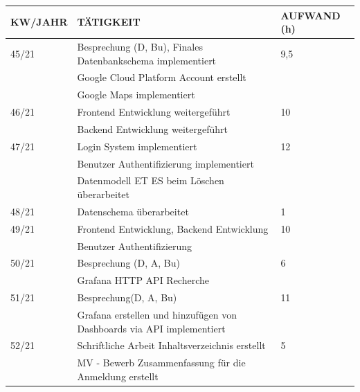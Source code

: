 \newpage
\begin{table}[h]
	\begin{tabular}{|l|l|l|}
		\hline
		\textbf{KW/JAHR} &     \textbf{TÄTIGKEIT}  & 	\textbf{AUFWAND (h)}    \\ \hline
		
		45/21   & Besprechung (D, Bu), Finales Datenbankschema implementiert & 9,5	\\ 
		
		& Google Cloud Platform Account erstellt & \\
		& Google Maps implementiert & \\ \hline
		
		
		
		
		46/21   & Frontend Entwicklung weitergeführt  & 10 	\\
		& Backend Entwicklung weitergeführt& \\ \hline
		
		
		
		
		47/21   & Login System implementiert  & 12 	\\
			& Benutzer Authentifizierung implementiert & \\ 
			& Datenmodell ET ES beim Löschen überarbeitet & \\ \hline
		
		
		
		
		
		48/21   & Datenschema überarbeitet& 1	\\ \hline
		
		
		49/21   & Frontend Entwicklung, Backend Entwicklung & 10 \\ 
		
	& Benutzer Authentifizierung & \\ 	\hline
		
		
		
		
		
		
		
		50/21   & Besprechung (D, A, Bu) & 6   \\
		& Grafana HTTP API Recherche & \\ \hline	
		
		
		
		51/21   & Besprechung(D, A, Bu)  & 11 \\
		& Grafana erstellen und hinzufügen von Dashboards via API implementiert & 	\\ \hline		
		
		
		52/21   & Schriftliche Arbeit Inhaltsverzeichnis erstellt  & 5 \\ 
		& MV - Bewerb Zusammenfassung für die Anmeldung erstellt & \\	\hline		
		

\end{tabular}
\end{table}

